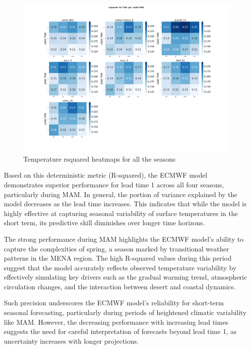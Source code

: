 \begin{figure}[H]
    \centering
    \includegraphics[width=1\linewidth]{plots/det/rsquared/rsquared_T2M_mena.png}
    \caption{Temperature rsquared heatmaps for all the seasons}
    \label{fig:CORR_djf_t2m}
\end{figure}
Based on this deterministic metric (R-squared), the ECMWF model demonstrates superior performance for lead time 1 across all four seasons, particularly during MAM. In general, the portion of variance explained by the model decreases as the lead time increases. This indicates that while the model is highly effective at capturing seasonal variability of surface temperatures in the short term, its predictive skill diminishes over longer time horizons.

The strong performance during MAM highlights the ECMWF model’s ability to capture the complexities of spring, a season marked by transitional weather patterns in the MENA region. The high R-squared values during this period suggest that the model accurately reflects observed temperature variability by effectively simulating key drivers such as the gradual warming trend, atmospheric circulation changes, and the interaction between desert and coastal dynamics.

Such precision underscores the ECMWF model’s reliability for short-term seasonal forecasting, particularly during periods of heightened climatic variability like MAM. However, the decreasing performance with increasing lead times suggests the need for careful interpretation of forecasts beyond lead time 1, as uncertainty increases with longer projections.

